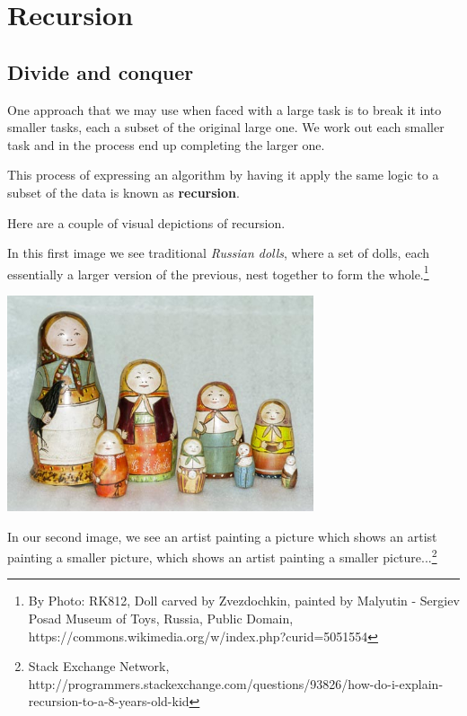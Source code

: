 
\chapter{Recursion}



\section{Divide and conquer}


One approach that we may use when faced with a large task is to break it into smaller tasks, each a subset of the original large one. We work out each smaller task and in the process end up completing the larger one.

This process of expressing an algorithm by having it apply the same logic to a subset of the data is known as \textbf{recursion}.

Here are a couple of visual depictions of recursion. 

In this first image we see traditional \textit{Russian dolls}, where a set of dolls, each essentially a larger version of the previous, nest together to form the whole.\footnote{By Photo: RK812, Doll carved by Zvezdochkin, painted by Malyutin - Sergiev Posad Museum of Toys, Russia, Public Domain, https://commons.wikimedia.org/w/index.php?curid=5051554}

\beforefig
\centerline{\includegraphics[height=2.5in]{images/recursion_First_matryoshka_museum_doll_open.jpg}}
\afterfig

In our second image, we see an artist painting a picture which shows an artist painting a smaller picture, which shows an artist painting a smaller picture...\footnote{Stack Exchange Network, http://programmers.stackexchange.com/questions/93826/how-do-i-explain-recursion-to-a-8-years-old-kid}

